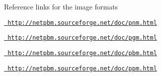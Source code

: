 Reference links for the image formats

\href{http://netpbm.sourceforge.net/doc/pnm.html}{\texttt{ http\+://netpbm.\+sourceforge.\+net/doc/pnm.\+html}}

\href{http://netpbm.sourceforge.net/doc/pgm.html}{\texttt{ http\+://netpbm.\+sourceforge.\+net/doc/pgm.\+html}}

\href{http://netpbm.sourceforge.net/doc/pbm.html}{\texttt{ http\+://netpbm.\+sourceforge.\+net/doc/pbm.\+html}}

\href{http://netpbm.sourceforge.net/doc/ppm.html}{\texttt{ http\+://netpbm.\+sourceforge.\+net/doc/ppm.\+html}} 